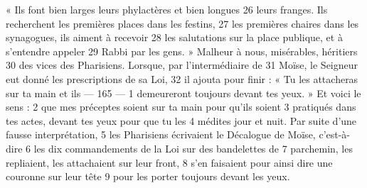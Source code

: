 « Ils font bien larges leurs phylactères et bien longues	 
26	 	leurs franges. Ils recherchent les premières places dans les festins,	 
27	 	les premières chaires dans les synagogues, ils aiment à recevoir	 
28	 	les salutations sur la place publique, et à s'entendre appeler	 
29	 	Rabbi par les gens. » Malheur à nous, misérables, héritiers	 
30	 	des vices des Pharisiens. Lorsque, par l'intermédiaire de	 
31	 	Moïse, le Seigneur eut donné les prescriptions de sa Loi,	 
32	 	il ajouta pour finir : « Tu les attacheras sur ta main et ils	 
 	--- 165 ---	 
1	 	demeureront toujours devant tes yeux. » Et voici le sens :	 
2	 	que mes préceptes soient sur ta main pour qu'ils soient	 
3	 	pratiqués dans tes actes, devant tes yeux pour que tu les	 
4	 	médites jour et nuit. Par suite d'une fausse interprétation,	 
5	 	les Pharisiens écrivaient le Décalogue de Moïse, c'est-à-dire	 
6	 	les dix commandements de la Loi sur des bandelettes de	 
7	 	parchemin, les repliaient, les attachaient sur leur front,	 
8	 	s'en faisaient pour ainsi dire une couronne sur leur tête	 
9	 	pour les porter toujours devant les yeux.